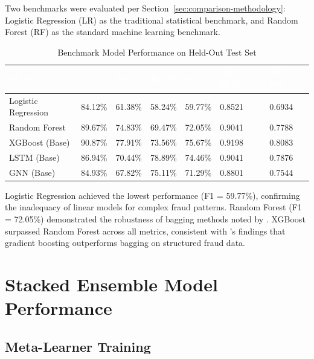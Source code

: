 \documentclass[12pt,a4paper,oneside]{report}
\numberwithin{equation}{chapter}
\renewcommand{\arraystretch}{1.6}
\begin{document}
Two benchmarks were evaluated per Section~\ref{sec:comparison-methodology}: Logistic Regression
(LR) as the traditional statistical benchmark, and Random Forest (RF) as the standard machine
learning benchmark.

\begin{table}[H]
\centering
\caption{Benchmark Model Performance on Held-Out Test Set}
\label{tab:benchmarks}
\renewcommand{\arraystretch}{1.4}
\small
\begin{tabular}{L{4.0cm} C{1.6cm} C{1.6cm} C{1.6cm} C{1.6cm} C{1.9cm} C{1.8cm}}
\toprule
{}
\textcolor{white}{\textbf{Model}} &
\textcolor{white}{\textbf{Acc.}} &
\textcolor{white}{\textbf{Prec.}} &
\textcolor{white}{\textbf{Recall}} &
\textcolor{white}{\textbf{F1}} &
\textcolor{white}{\textbf{AUC-ROC}} &
\textcolor{white}{\textbf{AUC-PR}} \\
\midrule
{}
Logistic Regression & 84.12\% & 61.38\% & 58.24\% & 59.77\% & 0.8521 & 0.6934 \\
Random Forest       & 89.67\% & 74.83\% & 69.47\% & 72.05\% & 0.9041 & 0.7788 \\
XGBoost (Base)      & 90.87\% & 77.91\% & 73.56\% & 75.67\% & 0.9198 & 0.8083 \\
LSTM (Base)         & 86.94\% & 70.44\% & 78.89\% & 74.46\% & 0.9041 & 0.7876 \\
GNN (Base)          & 84.93\% & 67.82\% & 75.11\% & 71.29\% & 0.8801 & 0.7544 \\
\bottomrule
\end{tabular}
\end{table}

Logistic Regression achieved the lowest performance (F1 = 59.77\%), confirming the inadequacy of
linear models for complex fraud patterns. Random Forest (F1 = 72.05\%) demonstrated the
robustness of bagging methods noted by \cite{Ming2024,Eteng2025}. XGBoost surpassed Random
Forest across all metrics, consistent with 's findings that gradient boosting
outperforms bagging on structured fraud data.

\section{Stacked Ensemble Model Performance}

\subsection{Meta-Learner Training}
\end{document}
